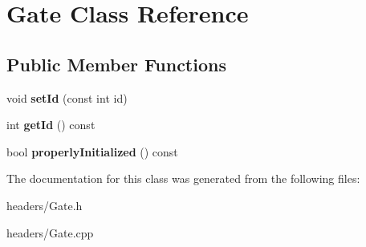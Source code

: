 \hypertarget{class_gate}{}\section{Gate Class Reference}
\label{class_gate}
\subsection*{Public Member Functions}
\begin{DoxyCompactItemize}
\item 
\mbox{\label{class_gate_aa770ce8dbc324b0c44c1345bb1e77672}} 
void {\bfseries set\+Id} (const int id)
\item 
\mbox{\label{class_gate_a9ba3d9aa4f60f5b97a1fb391b7490938}} 
int {\bfseries get\+Id} () const
\item 
\mbox{\label{class_gate_a51a6794e1e26f03c75f469a6ee8d3432}} 
bool {\bfseries properly\+Initialized} () const
\end{DoxyCompactItemize}


The documentation for this class was generated from the following files\+:\begin{DoxyCompactItemize}
\item 
headers/Gate.\+h\item 
headers/Gate.\+cpp\end{DoxyCompactItemize}
